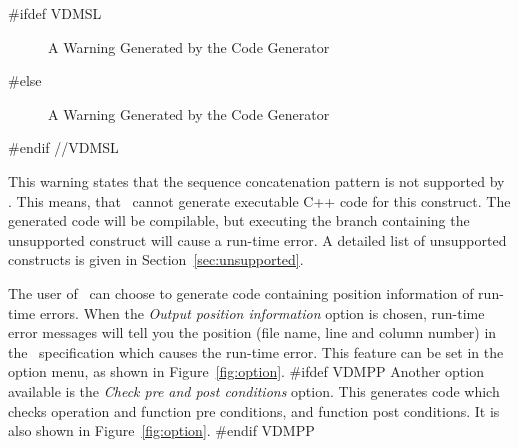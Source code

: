 \documentclass[\pformat,12pt]{article}
\begin{document}
#ifdef VDMSL
\begin{figure}[tbh]
\begin{center}
\mbox{}
\caption{A Warning Generated by the Code Generator}\label{fig:cg_error}
\end{center}
\end{figure}
#else
\begin{figure}[tbh]
\begin{center}
\mbox{}
\caption{A Warning Generated by the Code Generator}\label{fig:cg_error}
\end{center}
\end{figure}
#endif //VDMSL


This warning states that the sequence concatenation pattern is not
supported by \tcg{}. This means, that \tcg\ cannot generate executable
C++ code for this construct.  The generated code will be compilable,
but executing the branch containing the unsupported construct will
cause a run-time error. A detailed list of unsupported constructs is
given in Section~\ref{sec:unsupported}.

The user of \tcg\ can choose to generate code containing position
information of run-time errors.  When the {\em Output position
  information} option is chosen, run-time error messages will
tell you the position (file name, line and column number) in the \VDM\ 
specification which causes the run-time error. This feature can be
  set in the option menu, as shown in Figure~\ref{fig:option}.
#ifdef VDMPP
Another option available is the \textit{Check pre and post conditions}
option. This generates code which checks operation
and function pre conditions, and function post conditions. It is also
shown in Figure~\ref{fig:option}.
#endif VDMPP
\end{document}
